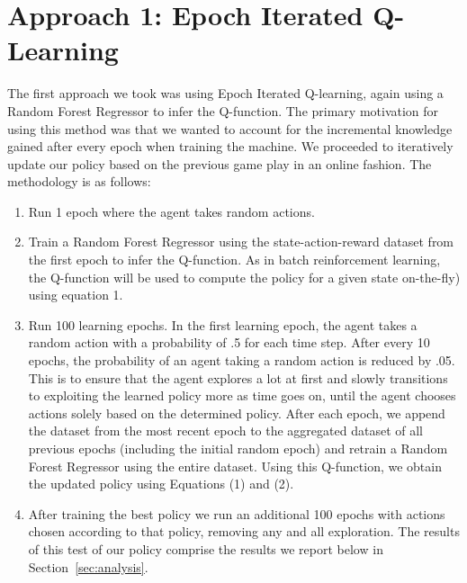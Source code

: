 \documentclass[11pt, oneside]{article}   	%
\begin{document}
\section{Approach 1: Epoch Iterated Q-Learning}
The first approach we took was using Epoch Iterated Q-learning, again using a Random Forest Regressor to infer the Q-function.  The primary motivation for using this method was that we wanted to account for the incremental knowledge gained after every epoch when training the machine. We proceeded to iteratively update our policy based on the previous game play in an online fashion. The methodology is as follows:
\begin{enumerate}
  \item Run 1 epoch where the agent takes random actions.
  \item Train a Random Forest Regressor using the state-action-reward dataset from the first epoch to infer the Q-function.  As in batch reinforcement learning, the Q-function will be used to compute the policy for a given state on-the-fly) using equation 1.
  \item Run 100 learning epochs.  In the first learning epoch, the agent takes a random action with a probability of .5 for each time step.  After every 10 epochs, the probability of an agent taking a random action is reduced by .05.  This is to ensure that the agent explores a lot at first and slowly transitions to exploiting the learned policy more as time goes on, until the agent chooses actions solely based on the determined policy.  After each epoch, we append the dataset from the most recent epoch to the aggregated dataset of all previous epochs (including the initial random epoch) and retrain a Random Forest Regressor using the entire dataset.  Using this Q-function, we obtain the updated policy using Equations (1) and (2).
 \item After training the best policy we run an additional 100 epochs with actions chosen according to that policy, removing any and all exploration. The results of this test of our policy comprise the results we report below in Section~\ref{sec:analysis}.
\end{enumerate}
\end{document}
